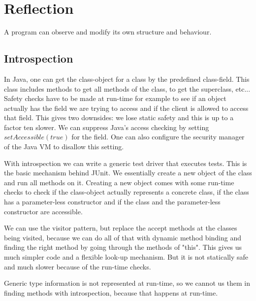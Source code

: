 \section{Reflection}
\begin{mytitle}[Reflection] A program can observe and modify its own structure and behaviour. 
\end{mytitle}

\subsection{Introspection}
\begin{mytitle} In Java, one can get the class-object for a class by the predefined class-field. This class includes methods to get all methods of the class, to get the superclass, etc... Safety checks have to be made at run-time for example to see if an object actually has the field we are trying to access and if the client is allowed to access that field. This gives two downsides: we lose static safety and this is up to a factor ten slower. We can suppress Java's access checking by setting $setAccessible(true)$ for the field. One can also configure the security manager of the Java VM to disallow this setting.
\end{mytitle}
\begin{mytitle} With introspection we can write a generic test driver that executes tests. This is the basic mechanism behind JUnit. We essentially create a new object of the class and run all methods on it. Creating a new object comes with some run-time checks to check if the class-object actually represents a concrete class, if the class has a parameter-less constructor and if the class and the parameter-less constructor are accessible.
\end{mytitle}
\begin{mytitle} We can use the visitor pattern, but replace the accept methods at the classes being visited, because we can do all of that with dynamic method binding and finding the right method by going through the methods of "this". This gives us much simpler code and a flexible look-up mechanism.  But it is not statically safe and much slower because of the run-time checks.
\end{mytitle}
\begin{mytitle} Generic type information is not represented at run-time, so we cannot us them in finding methods with introspection, because that happens at run-time.
\end{mytitle}

